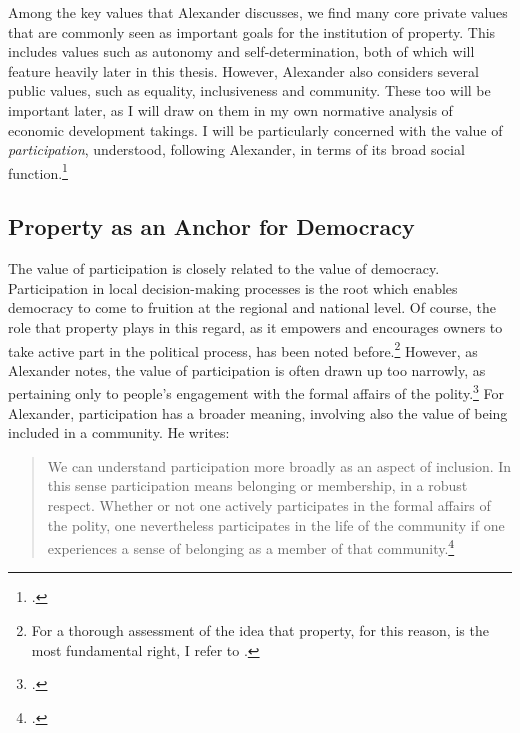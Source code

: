 {Among the key values that Alexander discusses, we find many core private values that are commonly seen as important goals for the institution of property. This includes values such as autonomy and self-determination, both of which will feature heavily later in this thesis. However, Alexander also considers several public values, such as equality, inclusiveness and community. These too will be important later, as I will draw on them in my own normative analysis of economic development takings. I will be particularly concerned with the value of {\it participation}, understood, following Alexander, in terms of its broad social function.\footcite[1275-1276]{alexander14}
}

\subsection{Property as an Anchor for Democracy}

The value of participation is closely related to the value of democracy. Participation in local decision-making processes is the root which enables democracy to come to fruition at the regional and national level. Of course, the role that property plays in this regard, as it empowers and encourages owners to take active part in the political process, has been noted before.\footnote{For a thorough assessment of the idea that property, for this reason, is the most fundamental right, I refer to \cite{rose96}.} However, as Alexander notes, the value of participation is often drawn up too narrowly, as pertaining only to people's engagement with the formal affairs of the polity.\footcite[1275]{alexander14} For Alexander, participation has a broader meaning, involving also the value of being included in a community. He writes:

\begin{quote}
We can understand participation more broadly as an aspect of inclusion. In this sense participation means belonging or membership, in a robust respect. Whether or not one actively participates in the formal affairs of the polity, one nevertheless participates in the life of the community if one experiences a sense of belonging as a member of that community.\footcite[1275]{alexander14}
\end{quote}

